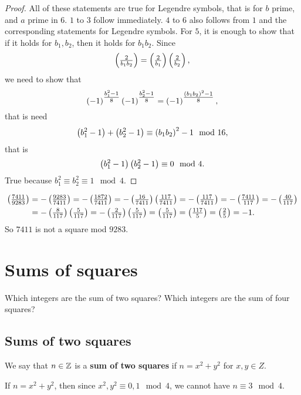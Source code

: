 \begin{proof}
All of these statements are true for Legendre symbols, that is for $ b $ prime, and $ a $ prime in $ 6 $. $ 1 $ to $ 3 $ follow immediately. $ 4 $ to $ 6 $ also follows from $ 1 $ and the corresponding statements for Legendre symbols. For $ 5 $, it is enough to show that if it holds for $ b_1, b_2 $, then it holds for $ b_1b_2 $. Since
$$ \left( \tfrac{2}{b_1b_2} \right) = \left( \tfrac{2}{b_1} \right)\left( \tfrac{2}{b_2} \right), $$
we need to show that
$$ \left( -1 \right)^{\tfrac{b_1^2 - 1}{8}}\left( -1 \right)^{\tfrac{b_2^2 - 1}{8}} = \left( -1 \right)^{\tfrac{\left( b_1b_2 \right)^2 - 1}{8}}, $$
that is need
$$ \left( b_1^2 - 1 \right) + \left( b_2^2 - 1 \right) \equiv \left( b_1b_2 \right)^2 - 1 \mod 16, $$
that is
$$ \left( b_1^2 - 1 \right)\left( b_2^2 - 1 \right) \equiv 0 \mod 4. $$
True because $ b_1^2 \equiv b_2^2 \equiv 1 \mod 4 $.
\end{proof}

\begin{example*}
\begin{align*}
\left( \tfrac{7411}{9283} \right)
& = -\left( \tfrac{9283}{7411} \right) = -\left( \tfrac{1872}{7411} \right) = -\left( \tfrac{16}{7411} \right)\left( \tfrac{117}{7411} \right) = -\left( \tfrac{117}{7411} \right) = -\left( \tfrac{7411}{117} \right) = -\left( \tfrac{40}{117} \right) \\
& = -\left( \tfrac{8}{117} \right)\left( \tfrac{5}{117} \right) = -\left( \tfrac{2}{117} \right)\left( \tfrac{5}{117} \right) = \left( \tfrac{5}{117} \right) = \left( \tfrac{117}{5} \right) = \left( \tfrac{2}{5} \right) = -1.
\end{align*}
So $ 7411 $ is not a square mod $ 9283 $.
\end{example*}

\pagebreak

\section{Sums of squares}

Which integers are the sum of two squares? Which integers are the sum of four squares?

\subsection{Sums of two squares}

\begin{definition}
We say that $ n \in \mathbb{Z} $ is a \textbf{sum of two squares} if $ n = x^2 + y^2 $ for $ x, y \in Z $.
\end{definition}

\begin{example*}
If $ n = x^2 + y^2 $, then since $ x^2, y^2 \equiv 0, 1 \mod 4 $, we cannot have $ n \equiv 3 \mod 4 $.
\end{example*}

